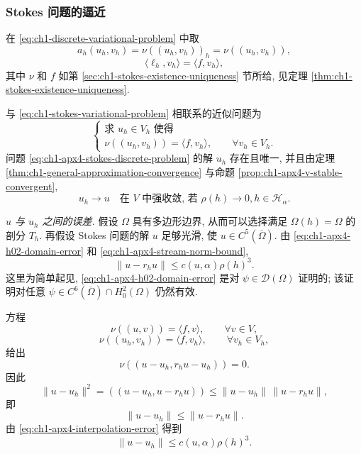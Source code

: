 \subsubsection*{Stokes 问题的逼近}

在 \eqref{eq:ch1-discrete-variational-problem} 中取
\begin{equation}
a_h(u_h,v_h)=\nu((u_h,v_h))_h=\nu((u_h,v_h)),
\label{eq:ch1-apx4-discrete-bilinear-form}
\end{equation}
\begin{equation}
\langle\ell_h,v_h\rangle=\langle f,v_h\rangle,
\label{eq:ch1-apx4-discrete-linear-form}
\end{equation}
其中 $\nu$ 和 $f$ 如第 \ref{sec:ch1-stokes-existence-uniqueness} 节所给, 见定理 \ref{thm:ch1-stokes-existence-uniqueness}.

与 \eqref{eq:ch1-stokes-variational-problem} 相联系的近似问题为
\begin{equation}
\left\{
\begin{array}{l}
\text{求 }u_h\in V_h\text{ 使得}\\
\nu((u_h,v_h))=\langle f,v_h\rangle,
\qquad\forall v_h\in V_h.
\end{array}
\right.
\label{eq:ch1-apx4-stokes-discrete-problem}
\end{equation}
问题 \eqref{eq:ch1-apx4-stokes-discrete-problem} 的解 $u_h$ 存在且唯一, 并且由定理 \ref{thm:ch1-general-approximation-convergence} 与命题 \ref{prop:ch1-apx4-v-stable-convergent},
\begin{equation}
u_h\longrightarrow u
\quad\text{在 }V\text{ 中强收敛, 若 }\rho(h)\to0, h\in\mathcal H_\alpha.
\label{eq:ch1-apx4-stokes-convergence}
\end{equation}

\emph{$u$ 与 $u_h$ 之间的误差.} 假设 $\Omega$ 具有多边形边界, 从而可以选择满足 $\Omega(h)=\Omega$ 的剖分 $T_h$. 再假设 Stokes 问题的解 $u$ 足够光滑, 使 $u\in C^5(\overline\Omega)$. 由 \eqref{eq:ch1-apx4-h02-domain-error} 和 \eqref{eq:ch1-apx4-stream-norm-bound},
\begin{equation}
\|u-r_hu\|\leq c(u,\alpha)\rho(h)^3.
\label{eq:ch1-apx4-interpolation-error}
\end{equation}
这里为简单起见, \eqref{eq:ch1-apx4-h02-domain-error} 是对 $\psi\in\mathcal D(\Omega)$ 证明的; 该证明对任意 $\psi\in C^6(\overline\Omega)\cap H_0^2(\Omega)$ 仍然有效.

方程
\[
\nu((u,v))=\langle f,v\rangle,
\qquad\forall v\in V,
\]
\[
\nu((u_h,v_h))=\langle f,v_h\rangle,
\qquad\forall v_h\in V_h,
\]
给出
\[
\nu((u-u_h,r_hu-u_h))=0.
\]
因此
\[
\|u-u_h\|^2=((u-u_h,u-r_hu))
\leq\|u-u_h\|\,\|u-r_hu\|,
\]
即
\[
\|u-u_h\|\leq\|u-r_hu\|.
\]
由 \eqref{eq:ch1-apx4-interpolation-error} 得到
\begin{equation}
\|u-u_h\|\leq c(u,\alpha)\rho(h)^3.
\label{eq:ch1-apx4-stokes-error}
\end{equation}

